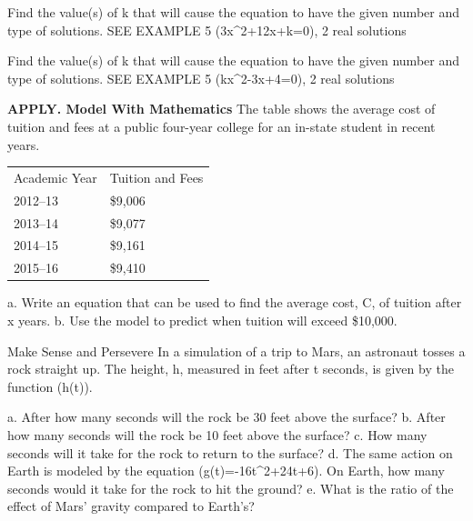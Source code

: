 \documentclass{article}
\newenvironment{practice}[2]{}{}        %
\newcommand{\answer}[1]{}               %
\newcommand{\placeholder}[2]{}          %
\newcommand{\te}[1]{}                   %
\begin{document}
\begin{practice}{33}{1}
Find the value(s) of k that will cause the equation to have the given number and type of solutions. SEE EXAMPLE 5
(3x^2+12x+k=0), 2 real solutions
\answer{(k<12)}
\end{practice}
\begin{practice}{34}{1}
Find the value(s) of k that will cause the equation to have the given number and type of solutions. SEE EXAMPLE 5
(kx^2-3x+4=0), 2 real solutions
\answer{(k<\frac{9}{16})}
\te{Printed answer does not exclude (k=0), which makes the equation linear.}
\end{practice}
\begin{practice}{35}{3}
\textbf{APPLY. Model With Mathematics} The table shows the average cost of tuition and fees at a public four-year college for an in-state student in recent years.
\begin{tabular}{ll}
Academic Year & Tuition and Fees \\
2012--13 & \$9,006 \\
2013--14 & \$9,077 \\
2014--15 & \$9,161 \\
2015--16 & \$9,410 \\
\end{tabular}
a. Write an equation that can be used to find the average cost, C, of tuition after x years.
b. Use the model to predict when tuition will exceed \$10,000.
\answer{a. (C=44.5x^2-3.9x+9013.6) where x represents the number of years after 2012--13. b. 2017--2018}
\end{practice}
\begin{practice}{36}{3}
Make Sense and Persevere In a simulation of a trip to Mars, an astronaut tosses a rock straight up. The height, h, measured in feet after t seconds, is given by the function (h(t)).
\placeholder{illustration}{Black tablet displays an astronaut tossing an orange rock upward on Mars, a rover to the left, and orange terrain in the background. The rock's callout reads (h(t)=-6t^2+24t+6).}
a. After how many seconds will the rock be 30 feet above the surface?
b. After how many seconds will the rock be 10 feet above the surface?
c. How many seconds will it take for the rock to return to the surface?
d. The same action on Earth is modeled by the equation (g(t)=-16t^2+24t+6). On Earth, how many seconds would it take for the rock to hit the ground?
e. What is the ratio of the effect of Mars' gravity compared to Earth's?
\answer{a. 2 seconds; b. after about 0.2 seconds and again at about 3.8 seconds; c. about 4.2 seconds; d. about 1.72 seconds; e. 3:8}
\end{practice}
\end{document}
